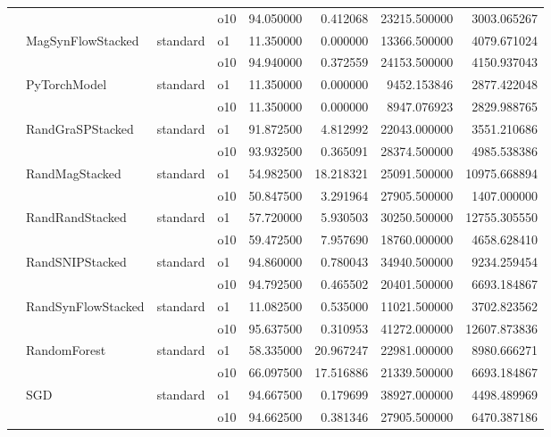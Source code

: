 \begin{longtable}{llllrrrr}
      &     &         & o10 &  94.050000 &   0.412068 &     23215.500000 &   3003.065267 \\
      & MagSynFlowStacked & standard & o1 &  11.350000 &   0.000000 &     13366.500000 &   4079.671024 \\
      &     &         & o10 &  94.940000 &   0.372559 &     24153.500000 &   4150.937043 \\
      & PyTorchModel & standard & o1 &  11.350000 &   0.000000 &      9452.153846 &   2877.422048 \\
      &     &         & o10 &  11.350000 &   0.000000 &      8947.076923 &   2829.988765 \\
      & RandGraSPStacked & standard & o1 &  91.872500 &   4.812992 &     22043.000000 &   3551.210686 \\
      &     &         & o10 &  93.932500 &   0.365091 &     28374.500000 &   4985.538386 \\
      & RandMagStacked & standard & o1 &  54.982500 &  18.218321 &     25091.500000 &  10975.668894 \\
      &     &         & o10 &  50.847500 &   3.291964 &     27905.500000 &   1407.000000 \\
      & RandRandStacked & standard & o1 &  57.720000 &   5.930503 &     30250.500000 &  12755.305550 \\
      &     &         & o10 &  59.472500 &   7.957690 &     18760.000000 &   4658.628410 \\
      & RandSNIPStacked & standard & o1 &  94.860000 &   0.780043 &     34940.500000 &   9234.259454 \\
      &     &         & o10 &  94.792500 &   0.465502 &     20401.500000 &   6693.184867 \\
      & RandSynFlowStacked & standard & o1 &  11.082500 &   0.535000 &     11021.500000 &   3702.823562 \\
      &     &         & o10 &  95.637500 &   0.310953 &     41272.000000 &  12607.873836 \\
      & RandomForest & standard & o1 &  58.335000 &  20.967247 &     22981.000000 &   8980.666271 \\
      &     &         & o10 &  66.097500 &  17.516886 &     21339.500000 &   6693.184867 \\
      & SGD & standard & o1 &  94.667500 &   0.179699 &     38927.000000 &   4498.489969 \\
      &     &         & o10 &  94.662500 &   0.381346 &     27905.500000 &   6470.387186 \\

\end{longtable}
